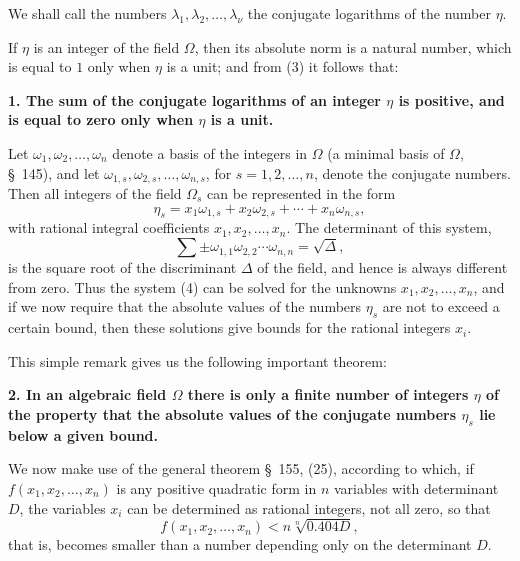 \documentclass[11pt]{article}
\begin{document}
We shall call the numbers $\lambda_1,\lambda_2,\ldots,\lambda_\nu$ the conjugate logarithms of the number $\eta$.

If $\eta$ is an integer of the field $\Omega$, then its absolute norm is a natural number, which is equal to $1$ only when $\eta$ is a unit; and from (3) it follows that:

\textbf{1. The sum of the conjugate logarithms of an integer $\eta$ is positive, and is equal to zero only when $\eta$ is a unit.}

Let $\omega_1,\omega_2,\ldots,\omega_n$ denote a basis of the integers in $\Omega$ (a minimal basis of $\Omega$, \S~145), and let $\omega_{1,s},\omega_{2,s},\ldots,\omega_{n,s}$, for $s=1,2,\ldots,n$, denote the conjugate numbers. Then all integers of the field $\Omega_s$ can be represented in the form
\begin{equation}
\eta_s=x_1\omega_{1,s}+x_2\omega_{2,s}+\cdots+x_n\omega_{n,s},
\tag{4}
\end{equation}
with rational integral coefficients $x_1,x_2,\ldots,x_n$. The determinant of this system,
\[
\sum \pm \omega_{1,1}\omega_{2,2}\cdots\omega_{n,n}=\sqrt{\Delta},
\]
is the square root of the discriminant $\Delta$ of the field, and hence is always different from zero. Thus the system (4) can be solved for the unknowns $x_1,x_2,\ldots,x_n$, and if we now require that the absolute values of the numbers $\eta_s$ are not to exceed a certain bound, then these solutions give bounds for the rational integers $x_i$.

This simple remark gives us the following important theorem:

\textbf{2. In an algebraic field $\Omega$ there is only a finite number of integers $\eta$ of the property that the absolute values of the conjugate numbers $\eta_s$ lie below a given bound.}

We now make use of the general theorem \S~155, (25), according to which, if $f(x_1,x_2,\ldots,x_n)$ is any positive quadratic form in $n$ variables with determinant $D$, the variables $x_i$ can be determined as rational integers, not all zero, so that
\[
f(x_1,x_2,\ldots,x_n)< n\sqrt[n]{0.404D},
\]
that is, becomes smaller than a number depending only on the determinant $D$.
\end{document}
